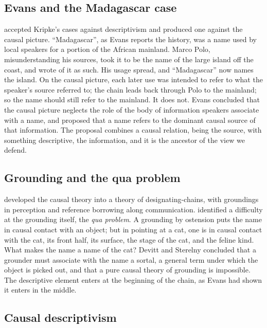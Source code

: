 \documentclass{situationist-preprint}
\begin{document}
\subsection{Evans and the Madagascar case}

\citet{Evans1973} accepted Kripke's cases against descriptivism and produced one against the causal picture. \enquote{Madagascar}, as Evans reports the history, was a name used by local speakers for a portion of the African mainland. Marco Polo, misunderstanding his sources, took it to be the name of the large island off the coast, and wrote of it as such. His usage spread, and \enquote{Madagascar} now names the island. On the causal picture, each later use was intended to refer to what the speaker's source referred to; the chain leads back through Polo to the mainland; so the name should still refer to the mainland. It does not. Evans concluded that the causal picture neglects the role of the body of information speakers associate with a name, and proposed that a name refers to the dominant causal source of that information. The proposal combines a causal relation, being the source, with something descriptive, the information, and it is the ancestor of the view we defend.

\subsection{Grounding and the qua problem}

\citet{Devitt1981} developed the causal theory into a theory of designating-chains, with groundings in perception and reference borrowing along communication. \citet{DevittSterelny1987} identified a difficulty at the grounding itself, the \emph{qua problem}. A grounding by ostension puts the name in causal contact with an object; but in pointing at a cat, one is in causal contact with the cat, its front half, its surface, the stage of the cat, and the feline kind. What makes the name a name of the cat? Devitt and Sterelny concluded that a grounder must associate with the name a sortal, a general term under which the object is picked out, and that a pure causal theory of grounding is impossible. The descriptive element enters at the beginning of the chain, as Evans had shown it enters in the middle.

\subsection{Causal descriptivism}
\end{document}
